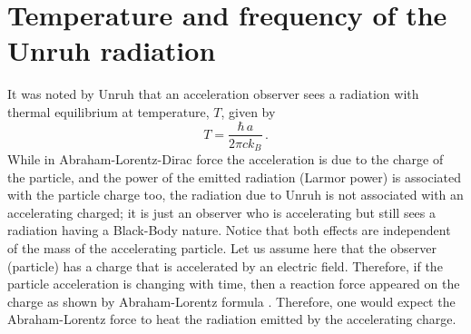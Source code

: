 \documentclass[12pt]{article}
\begin{document}
\section{{Temperature and frequency of the Unruh radiation}}

It was noted by Unruh that an acceleration observer sees a radiation with thermal equilibrium at temperature, $T$, given by {\cite{unruh}}
\begin{equation}
T=\frac{\hbar\, a}{2\pi c k_B}\,.
\end{equation}
While in Abraham-Lorentz-Dirac force the acceleration is due to the charge of the particle, and the power of the emitted radiation (Larmor power) is associated with the particle charge too, the radiation due to Unruh is not associated with an accelerating  charged; it is just an observer who is accelerating but still sees a radiation  having a Black-Body nature.  Notice that both effects are independent of the mass of the accelerating particle. Let us assume here that the observer (particle) has a charge that is accelerated by an electric field. Therefore, if the particle acceleration is changing with time, then a reaction force appeared on the charge as shown by Abraham-Lorentz formula {\cite{abraham,lorentz}}. Therefore, one would expect the Abraham-Lorentz force to heat the radiation emitted by the accelerating charge.
\end{document}
